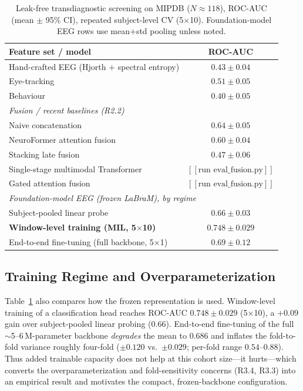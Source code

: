 \begin{table}[t]
\centering\footnotesize
\caption{Leak-free transdiagnostic screening on MIPDB ($N\approx118$), ROC-AUC
(mean $\pm$ 95\% CI), repeated subject-level CV (5$\times$10). Foundation-model EEG
rows use mean$+$std pooling unless noted.}
\label{tab:main}
\begin{tabular}{lc}
\toprule
\textbf{Feature set / model} & \textbf{ROC-AUC} \\
\midrule
Hand-crafted EEG (Hjorth $+$ spectral entropy) & $0.43 \pm 0.04$ \\
Eye-tracking & $0.51 \pm 0.05$ \\
Behaviour & $0.40 \pm 0.05$ \\
\midrule
\multicolumn{2}{l}{\textit{Fusion / recent baselines (R2.2)}} \\
\quad Naive concatenation & $0.64 \pm 0.05$ \\
\quad NeuroFormer attention fusion & $0.60 \pm 0.04$ \\
\quad Stacking late fusion & $0.47 \pm 0.06$ \\
\quad Single-stage multimodal Transformer & $[[\text{run eval\_fusion.py}]]$ \\
\quad Gated attention fusion & $[[\text{run eval\_fusion.py}]]$ \\
\midrule
\multicolumn{2}{l}{\textit{Foundation-model EEG (frozen LaBraM), by regime}} \\
\quad Subject-pooled linear probe & $0.66 \pm 0.03$ \\
\quad \textbf{Window-level training (MIL, 5$\times$10)} & $\mathbf{0.748 \pm 0.029}$ \\
\quad End-to-end fine-tuning (full backbone, 5$\times$1) & $0.69 \pm 0.12$ \\
\bottomrule
\end{tabular}
\end{table}

\subsection{Training Regime and Overparameterization}
Table~\ref{tab:main} also compares how the frozen representation is used. Window-level
training of a classification head reaches ROC-AUC $\mathbf{0.748 \pm 0.029}$
(5$\times$10), a $+0.09$ gain over subject-pooled linear probing ($0.66$).
End-to-end fine-tuning of the full $\sim$5--6\,M-parameter backbone \emph{degrades}
the mean to $0.686$ and inflates the fold-to-fold variance roughly four-fold
($\pm 0.120$ vs.\ $\pm 0.029$; per-fold range $0.54$--$0.88$). Thus added trainable
capacity does not help at this cohort size---it hurts---which converts the
overparameterization and fold-sensitivity concerns (R3.4, R3.3) into an empirical
result and motivates the compact, frozen-backbone configuration.

